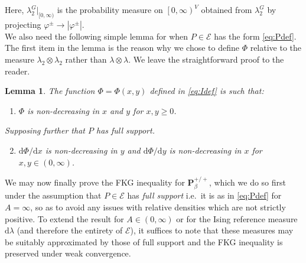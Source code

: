 \documentclass{article}
\newtheorem{lemma}[theorem]{Lemma}
\numberwithin{equation}{section}
\theoremstyle{definition}
\theoremstyle{definition}
\theoremstyle{remark}
\renewcommand{\d}{\mathrm{d}}
\newcommand\vp{\varphi}
\newcommand\Ec{\mathcal{E}}
\renewcommand{\d}{\mathrm{d}}
\renewcommand{\l}{\lambda}
\newcommand{\I}{\Phi}
\renewcommand{\P}{\mathrm{\mathbf{P}}}
\begin{document}
Here, $\l_2^G|_{[0,\infty)}$ is the probability measure on $\left[ 0,\infty \right)^V$ obtained from $\l_2^G$ by projecting $\vp^\pm \to |\vp^\pm|$.
\\[1em]
\noindent We also need the following simple lemma for when $P \in \Ec$ has the form \eqref{eq:Pdef}. The first item in the lemma is the reason why we chose to define $\I$ relative to the measure $\l_2 \otimes \l_2$ rather than $\l \otimes \l$.
We leave the straightforward proof to the reader.
\begin{lemma}\label{lemma:Iprops}
	The function $\I = \I(x,y)$ defined in \eqref{eq:Idef} is such that:
	\begin{enumerate}
		\item $\I$ is non-decreasing in $x$ and $y$ for $x,y \geq 0$.
	\end{enumerate}
	Supposing further that $P$ has full support.  
	\begin{enumerate}
		\setcounter{enumi}{1}
		\item $\d \I / \d x$ is non-decreasing in $y$ and $\d \I / \d y$ is non-decreasing in $x$ for $x,y \in (0,\infty)$.
	\end{enumerate}
\end{lemma}
We may now finally prove the FKG inequality for $\P_\beta^{+ / +}$, which we do so first under the assumption that $P \in \Ec$ has \emph{full support} i.e.~it is as in \eqref{eq:Pdef} for $A = \infty$, so as to avoid any issues with relative densities which are not strictly positive.
To extend the result for $A \in (0,\infty)$ or for the Ising reference measure $\d\l$ (and therefore the entirety of $\Ec$), it suffices to note that these measures may be suitably approximated by those of full support and the FKG inequality is preserved under weak convergence. 
\end{document}
